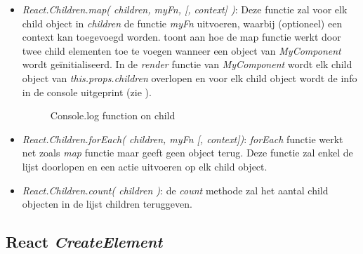 		\begin{itemize}
			\item \emph{React.Children.map( children, myFn, [, context] )}: Deze functie zal voor elk child object in \emph{children} de functie \emph{myFn} uitvoeren, waarbij (optioneel) een context kan toegevoegd worden.
			 toont aan hoe de map functie werkt door twee child elementen toe te voegen wanneer een object van \emph{MyComponent} wordt geïnitialiseerd. In de \emph{render} functie van \emph{MyComponent} wordt elk child object van \emph{this.props.children} overlopen en voor elk child object wordt de info in de console uitgeprint (zie ).
			\begin{figure}%
				\centering
				\caption{Console.log function on child}%
				\label{fig:mapconsole}%
			\end{figure}
			\item \emph{React.Children.forEach( children, myFn [, context])}: \emph{forEach} functie werkt net zoals \emph{map} functie maar geeft geen object terug. Deze functie zal enkel de lijst doorlopen en een actie uitvoeren op elk child object.
			\item \emph{React.Children.count( children )}: de \emph{count} methode zal het aantal child objecten in de lijst children teruggeven.
		\end{itemize}
	
	\subsection{React \emph{CreateElement}}
		
